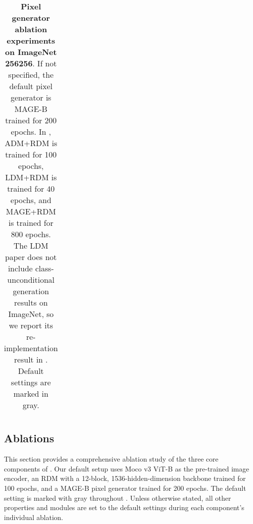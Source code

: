\begin{table*}[t]
{\begin{minipage}{0.35\linewidth}
{\begin{center}
\begin{tabular}{y{64} @{\hskip -0.07in} S[table-format=3.3]@{\hskip -0.03in} l S[table-format=3.3] @{\hskip -0.08in} l}
\end{tabular}
\end{center}}\end{minipage}
}
\hspace{2em}
\vspace{-1.2em}
\caption{\textbf{Pixel generator ablation experiments on ImageNet 256256}. If not specified, the default pixel generator is MAGE-B trained for 200 epochs. In , ADM+RDM is trained for 100 epochs, LDM+RDM is trained for 40 epochs, and MAGE+RDM is trained for 800 epochs. The LDM paper does not include class-unconditional generation results on ImageNet, so we report its re-implementation result in \cite{li2023mage}. Default settings are marked in \colorbox{baselinecolor}{gray}.}
\label{tab:ablations-pixel} \vspace{-7pt}
\end{table*}


\subsection{Ablations}
This section provides a comprehensive ablation study of the three core components of \name. Our default setup uses Moco v3 ViT-B as the pre-trained image encoder, an RDM with a 12-block, 1536-hidden-dimension backbone trained for 100 epochs, and a MAGE-B pixel generator trained for 200 epochs. The default setting is marked with \colorbox{baselinecolor}{gray} throughout . Unless otherwise stated, all other properties and modules are set to the default settings during each component's individual ablation.

